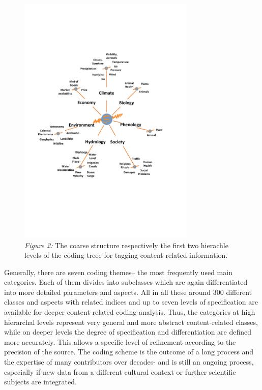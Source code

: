 \begin{figure}[H]
	\begin{center}
 \includegraphics[width=0.75\textwidth]{fig/notes/coding_tree.pdf}
 \caption*{\textit{Figure 2:} The coarse structure respectively the first two hierachle levels of the coding treee for tagging content-related information.}
 \end{center}
\end{figure}
Generally, there are seven coding themes– the most frequently used main categories. Each of them divides into subclasses which are again differentiated into more detailed parameters and aspects. All in all these around 300 different classes and aspects with related indices and up to seven levels of specification are available for deeper content-related coding analysis. Thus, the categories at high hierarchal levels represent very general and more abstract content-related classes, while on deeper levels the degree of specification and differentiation are defined more accurately. This allows a specific level of refinement according to the precision of the source. The coding scheme is the outcome of a long process and the expertise of many contributors over decades- and is still an ongoing process, especially if new data from a different cultural context or further scientific subjects are integrated.
